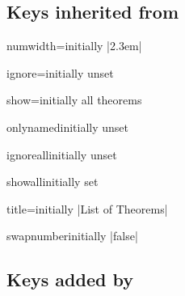 \documentclass{ltxdoc}
\begin{document}
\subsection{Keys inherited from }

\begin{docKey}{numwidth}{=}{initially |2.3em|}

\end{docKey}

\begin{docKey}{ignore}{=}{initially unset}

\end{docKey}

\begin{docKey}{show}{=}{initially all theorems}

\end{docKey}

\begin{docKey}{onlynamed}{}{initially unset}

\end{docKey}

\begin{docKey}{ignoreall}{}{initially unset}
\begin{keythmscode}[]
\listofkeytheorems[ignoreall,show=theorem]
\listofkeytheorems[
  ignoreall, show=conjecture,
  title=List of Conjectures
  ]
\end{keythmscode}
\end{docKey}

\begin{docKey}{showall}{}{initially set}

\end{docKey}

\begin{docKey}{title}{=}{initially |List of Theorems|}

\end{docKey}

\begin{docKey}{swapnumber}{}{initially |false|}

\end{docKey}

\subsection{Keys added by }
\end{document}
